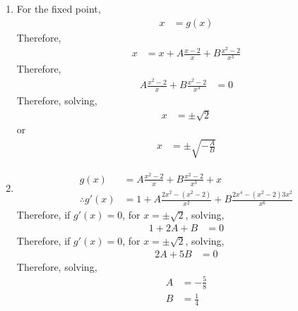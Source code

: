 \documentclass[fleqn, a4paper, 12pt, twoside, titlepage]{article}
\theoremstyle{definition}
\theoremstyle{theorem}
\begin{document}
\begin{solution}
	\begin{enumerate}[leftmargin=*]
		\item
			For the fixed point,
			\begin{align*}
				x &= g(x)
			\end{align*}
			Therefore,
			\begin{align*}
				x &= x + A \frac{x - 2}{x} + B \frac{x^2 - 2}{x^3}
			\end{align*}
			Therefore,
			\begin{align*}
				A \frac{x^2 - 2}{x} + B \frac{x^2 - 2}{x^3} &= 0
			\end{align*}
			Therefore, solving,
			\begin{align*}
				x &= \pm \sqrt{2}
			\end{align*}
			or
			\begin{align*}
				x &= \pm \sqrt{-\frac{A}{B}}
			\end{align*}
		\item
			\begin{align*}
				g(x) &= A \frac{x^2 - 2}{x} + B \frac{x^2 - 2}{x^3} + x\\
				\therefore g'(x) &= 1 + A \frac{2 x^2 - \left( x^2 - 2 \right)}{x^2} + B \frac{2 x^4 - \left( x^2 - 2 \right) 3 x^2}{x^6}
			\end{align*}
			Therefore, if $g'(x) = 0$, for $x = \pm \sqrt{2}$, solving,
			\begin{align*}
				1 + 2 A + B &= 0
			\end{align*}
			Therefore, if $g'(x) = 0$, for $x = \pm \sqrt{2}$, solving,
			\begin{align*}
				2 A + 5 B &= 0
			\end{align*}
			Therefore, solving,
			\begin{align*}
				A &= -\frac{5}{8}\\
				B &= \frac{1}{4}
			\end{align*}
	\end{enumerate}
\end{solution}
\end{document}
